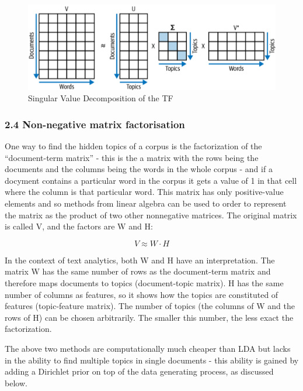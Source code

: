 \documentclass[
]{article}
\begin{document}
\begin{figure}

{\centering \includegraphics[width=1\linewidth]{images/lsa} 

}

\caption{Singular Value Decomposition of the TF}\label{fig:lsa_svd}
\end{figure}

\hypertarget{non-negative-matrix-factorisation}{%
\subsubsection{2.4 Non-negative matrix
factorisation}\label{non-negative-matrix-factorisation}}

One way to find the hidden topics of a corpus is the factorization of
the ``document-term matrix'' - this is the a matrix with the rows being
the documents and the columns being the words in the whole corpus - and
if a docyment contains a particular word in the corpus it gets a value
of 1 in that cell where the column is that particular word. This matrix
has only positive-value elements and so methods from linear algebra can
be used to order to represent the matrix as the product of two other
nonnegative matrices. The original matrix is called V, and the factors
are W and H:

\begin{equation}
V \approx W \cdot H
\end{equation}

In the context of text analytics, both W and H have an interpretation.
The matrix W has the same number of rows as the document-term matrix and
therefore maps documents to topics (document-topic matrix). H has the
same number of columns as features, so it shows how the topics are
constituted of features (topic-feature matrix). The number of topics
(the columns of W and the rows of H) can be chosen arbitrarily. The
smaller this number, the less exact the factorization.

The above two methods are computationally much cheaper than LDA but
lacks in the ability to find multiple topics in single documents - this
ability is gained by adding a Dirichlet prior on top of the data
generating process, as discussed below.
\end{document}
